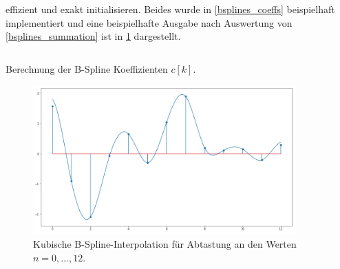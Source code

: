 effizient und exakt initialisieren. Beides wurde in \cref{bsplines_coeffs} beispielhaft implementiert und eine beispielhafte Ausgabe nach Auswertung von \eqref{bsplines_summation} ist in \cref{bsplines_interpol_pic} dargestellt.
%
\begin{listing}[t]
\inputminted{python3}{code/bsplines_coeffs.py}
\caption{Berechnung der B-Spline Koeffizienten $c[k]$.}\label{bsplines_coeffs}            
\end{listing}
%
\begin{figure}[t]
    \centering\includegraphics[width=0.9\textwidth]{img/bsplines/interpol.png}
    \caption{Kubische B-Spline-Interpolation f\"ur Abtastung an den Werten $n = 0, \dots, 12$.}\label{bsplines_interpol_pic}
\end{figure}
%
%
%

